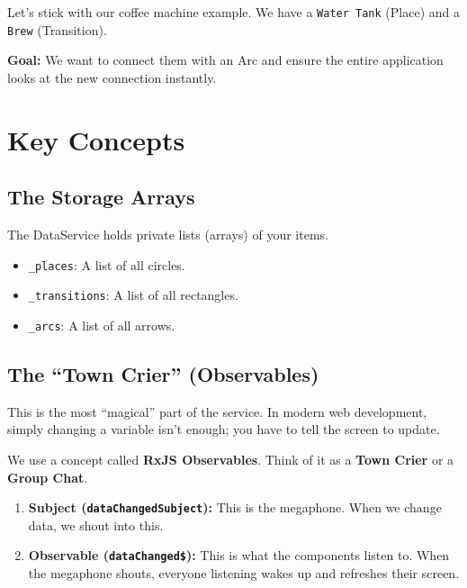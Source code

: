 \documentclass[a4paper,11pt,oneside]{report}
\begin{document}
Let's stick with our coffee machine example. We have a \texttt{Water Tank} (Place) and a \texttt{Brew} (Transition).

\textbf{Goal:} We want to connect them with an Arc and ensure the entire application looks at the new connection instantly.

\section{Key Concepts}

\subsection{The Storage Arrays}

The DataService holds private lists (arrays) of your items.
\begin{itemize}
    \item \texttt{\_places}: A list of all circles.
    \item \texttt{\_transitions}: A list of all rectangles.
    \item \texttt{\_arcs}: A list of all arrows.
\end{itemize}

\subsection{The ``Town Crier'' (Observables)}

This is the most ``magical'' part of the service. In modern web development, simply changing a variable isn't enough; you have to tell the screen to update.

We use a concept called \textbf{RxJS Observables}. Think of it as a \textbf{Town Crier} or a \textbf{Group Chat}.
\begin{enumerate}
    \item \textbf{Subject (\texttt{dataChangedSubject}):} This is the megaphone. When we change data, we shout into this.
    \item \textbf{Observable (\texttt{dataChanged\$}):} This is what the components listen to. When the megaphone shouts, everyone listening wakes up and refreshes their screen.
\end{enumerate}
\end{document}
